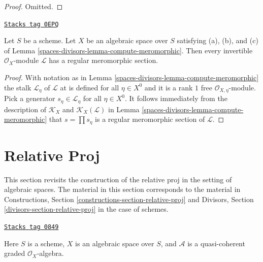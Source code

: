 \begin{proof}
Omitted.
\end{proof}

\begin{lemma}
\label{spaces-divisors-lemma-regular-meromorphic-section-exists}
\href{https://stacks.math.columbia.edu/tag/0EPQ}{\texttt{Stacks tag 0EPQ}}

Let $S$ be a scheme. Let $X$ be an algebraic space over $S$
satisfying (a), (b), and (c) of
Lemma \ref{spaces-divisors-lemma-compute-meromorphic}.
Then every invertible $\mathcal{O}_X$-module $\mathcal{L}$ has
a regular meromorphic section.
\end{lemma}

\begin{proof}
With notation as in Lemma \ref{spaces-divisors-lemma-compute-meromorphic}
the stalk $\mathcal{L}_\eta$ of $\mathcal{L}$ at is defined for all
$\eta \in X^0$ and it is a rank $1$ free $\mathcal{O}_{X, \eta}$-module.
Pick a generator $s_\eta \in \mathcal{L}_\eta$ for all $\eta \in X^0$.
It follows immediately from the description of
$\mathcal{K}_X$ and $\mathcal{K}_X(\mathcal{L})$
in Lemma \ref{spaces-divisors-lemma-compute-meromorphic}
that $s = \prod s_\eta$ is a regular meromorphic section of $\mathcal{L}$.
\end{proof}

\section{Relative Proj}
\label{spaces-divisors-section-relative-proj}
This section revisits the construction of the relative proj
in the setting of algebraic spaces. The material in this section
corresponds to the material in Constructions, Section
\ref{constructions-section-relative-proj}
and Divisors, Section \ref{divisors-section-relative-proj}
in the case of schemes.

\begin{definition}
\label{spaces-divisors-situation-relative-proj}
\href{https://stacks.math.columbia.edu/tag/0849}{\texttt{Stacks tag 0849}}

Here $S$ is a scheme, $X$ is an algebraic space over $S$, and
$\mathcal{A}$ is a quasi-coherent graded $\mathcal{O}_X$-algebra.
\end{definition}


